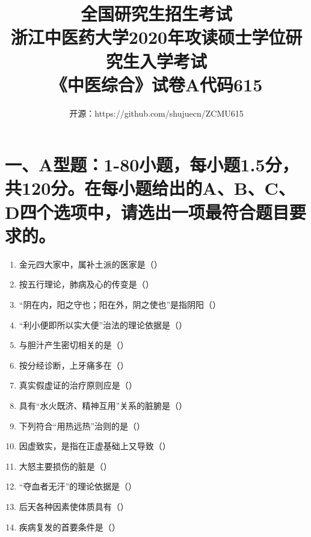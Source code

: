 \documentclass[a4paper,11pt]{ctexart}
\title{全国研究生招生考试 \\ 浙江中医药大学2020年攻读硕士学位研究生入学考试 \\ 《中医综合》试卷A代码615}
\author{开源：https://github.com/shujuecn/ZCMU615}
\date{}
\begin{document}
\maketitle

\section*{\large 一、A型题：1-80小题，每小题1.5分，共120分。在每小题给出的A、B、C、D四个选项中，请选出一项最符合题目要求的。}

\begin{enumerate}
      \item 金元四大家中，属补土派的医家是（\quad）
      \item 按五行理论，肺病及心的传变是（\quad）
      \item “阴在内，阳之守也；阳在外，阴之使也”是指阴阳（\quad）
      \item “利小便即所以实大便”治法的理论依据是（\quad）
      \item 与胆汁产生密切相关的是（\quad）
      \item 按分经诊断，上牙痛多在（\quad）
      \item 真实假虚证的治疗原则应是（\quad）
      \item 具有“水火既济、精神互用”关系的脏腑是（\quad）
      \item 下列符合“用热远热”治则的是（\quad）
      \item 因虚致实，是指在正虚基础上又导致（\quad）
      \item 大怒主要损伤的脏是（\quad）
      \item “夺血者无汗”的理论依据是（\quad）
      \item 后天各种因素使体质具有（\quad）
      \item 疾病复发的首要条件是（\quad）

\end{enumerate}
\end{document}
